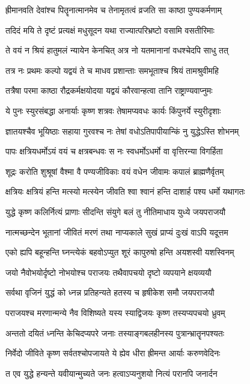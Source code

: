 \twolineshloka
{ह्रीमानवति देवांश्च पितॄनात्मानमेव च}
{तेनामृतत्वं व्रजति सा काष्ठा पुण्यकर्मणाम्}


\twolineshloka
{तदिदं मयि ते दृष्टं प्रत्यक्षं मधुसूदन}
{यथा राज्यात्परिभ्रष्टो वसामि वसतीरिमाः}


\twolineshloka
{ते वयं न श्रियं हातुमलं न्यायेन केनचित्}
{अत्र नो यतमानानां वधश्चेदपि साधु तत्}


\twolineshloka
{तत्र नः प्रथमः कल्पो यद्वयं ते च माधव}
{प्रशान्ताः समभूताश्च श्रियं तामश्रुवीमहि}


\twolineshloka
{तत्रैषा परमा काष्ठा रौद्रकर्मक्षयोदया}
{यद्वयं कौरवान्हत्वा तानि राष्ट्राण्यवाप्नुमः}


\twolineshloka
{ये पुनः स्युरसंबद्धा अनार्याः कृष्ण शत्रवः}
{तेषामप्यवधः कार्यः किंपुनर्ये स्युरीदृशाः}


\twolineshloka
{ज्ञातयश्चैव भूयिष्ठाः सहाया गुरवश्च नः}
{तेषां वधोऽतिपापीयान्किं नु युद्धेऽस्ति शोभनम्}


\twolineshloka
{पापः क्षत्रियधर्मोऽयं वयं च क्षत्रबन्धवः}
{स नः स्वधर्मोऽधर्मो वा वृत्तिरन्या विगर्हिता}


\twolineshloka
{शूद्रः करोति शुश्रूषां वैश्मा वै पण्यजीविकाः}
{वयं वधेन जीवामः कपालं ब्राह्मणैर्वृतम्}


\twolineshloka
{क्षत्रियः क्षत्रियं हन्ति मत्स्यो मत्स्येन जीवति}
{श्वा श्वानं हन्ति दाशार्ह पश्य धर्मो यथागतः}


\twolineshloka
{युद्धे कृष्ण कलिर्नित्यं प्राणाः सीदन्ति संयुगे}
{बलं तु नीतिमाधाय युध्ये जयपराजयौ}


\twolineshloka
{नात्मच्छन्देन भूतानां जीवितं मरणं तथा}
{नाप्यकाले सुखं प्राप्यं दुःखं वाऽपि यदूत्तम}


\twolineshloka
{एको ह्यपि बहून्हन्ति घ्नन्त्येकं बहवोऽप्युत}
{शूरं कापुरुषो हन्ति अयशस्वी यशस्विनम्}


\twolineshloka
{जयो नैवोभयोर्दृष्टो नोभयोश्च पराजयः}
{तथैवापचयो दृष्टो व्यपयाने क्षयव्ययौ}


\twolineshloka
{सर्वथा वृजिनं युद्धं को ध्नन्न प्रतिहन्यते}
{हतस्य च हृषीकेश समौ जयपराजयौ}


\twolineshloka
{पराजयश्च मरणान्मन्ये नैव विशिष्यते}
{यस्य स्याद्विजयः कृष्ण तस्यप्यपचयो ध्रुवम्}


\twolineshloka
{अन्ततो दयितं ध्नन्ति केचिदप्यपरे जनाः}
{तस्याङ्गबलहीनस्य पुत्रान्भ्रातॄनपश्यतः}


\twolineshloka
{निर्वेदो जीविते कृष्ण सर्वतश्चोपजायते}
{ये ह्येव धीरा ह्रीमन्त आर्याः करुणवेदिनः}


\twolineshloka
{त एव युद्धे हन्यन्ते यवीयान्मुच्यते जनः}
{हत्वाऽप्यनुशयो नित्यं परानपि जनार्दन}



